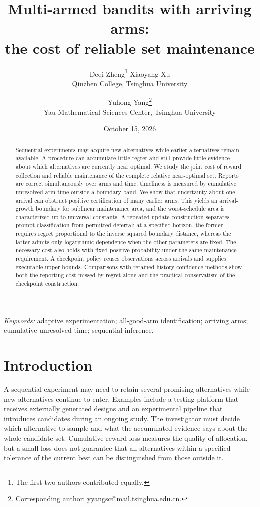 \documentclass[11pt]{article}
\title{Multi-armed bandits with arriving arms:\\the cost of reliable set maintenance}
\author{}
\author{Deqi Zheng\thanks{The first two authors contributed equally.} \quad
 Xiaoyang Xu\footnotemark[1] \\ Qiuzhen College, Tsinghua University
 \and Yuhong Yang\thanks{Corresponding author: yyangsc@mail.tsinghua.edu.cn.}\\
 Yau Mathematical Sciences Center, Tsinghua University}
\date{October 15, 2026}
\begin{document}
\maketitle
\begin{abstract}
Sequential experiments may acquire new alternatives while earlier alternatives
remain available. A procedure can accumulate little regret and still provide
little evidence about which alternatives are currently near optimal. We study
the joint cost of reward collection and reliable maintenance of the complete
relative near-optimal set. Reports are correct simultaneously over arms and
time; timeliness is measured by cumulative unresolved arm time outside a
boundary band. We show that uncertainty about one arrival can obstruct positive
certification of many earlier arms. This yields an arrival-growth boundary for
sublinear maintenance area, and the worst-schedule area is characterized up to
universal constants. A repeated-update construction separates prompt
classification from permitted deferral: at a specified horizon, the former
requires regret proportional to the inverse squared boundary distance, whereas
the latter admits only logarithmic dependence when the other parameters are
fixed. The necessary cost also holds with fixed positive probability under the
same maintenance requirement. A checkpoint policy reuses observations across
arrivals and supplies executable upper bounds. Comparisons with retained-history
confidence methods show both the reporting cost missed by regret alone and the
practical conservatism of the checkpoint construction.
\end{abstract}
\noindent\textit{Keywords:} adaptive experimentation; all-good-arm identification;
arriving arms; cumulative unresolved time; sequential inference.
\section{Introduction}
\label{sec:introduction}

A sequential experiment may need to retain several promising alternatives
while new alternatives continue to enter. Examples include a testing platform
that receives externally generated designs and an experimental pipeline that
introduces candidates during an ongoing study. The investigator must decide
which alternative to sample and what the accumulated evidence says about the
whole candidate set. Cumulative reward loss measures the quality of allocation,
but a small loss does not guarantee that all alternatives within a specified
tolerance of the current best can be distinguished from those outside it.
\end{document}
